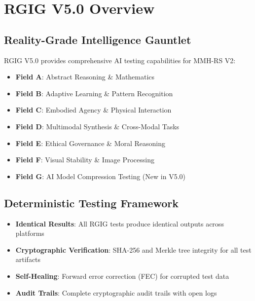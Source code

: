 \documentclass[12pt,a4paper]{article}
\begin{document}
\section{RGIG V5.0 Overview}

\subsection{Reality-Grade Intelligence Gauntlet}
RGIG V5.0 provides comprehensive AI testing capabilities for MMH-RS V2:

\begin{itemize}
    \item \textbf{Field A}: Abstract Reasoning \& Mathematics
    \item \textbf{Field B}: Adaptive Learning \& Pattern Recognition
    \item \textbf{Field C}: Embodied Agency \& Physical Interaction
    \item \textbf{Field D}: Multimodal Synthesis \& Cross-Modal Tasks
    \item \textbf{Field E}: Ethical Governance \& Moral Reasoning
    \item \textbf{Field F}: Visual Stability \& Image Processing
    \item \textbf{Field G}: AI Model Compression Testing (New in V5.0)
\end{itemize}

\subsection{Deterministic Testing Framework}
\begin{itemize}
    \item \textbf{Identical Results}: All RGIG tests produce identical outputs across platforms
    \item \textbf{Cryptographic Verification}: SHA-256 and Merkle tree integrity for all test artifacts
    \item \textbf{Self-Healing}: Forward error correction (FEC) for corrupted test data
    \item \textbf{Audit Trails}: Complete cryptographic audit trails with open logs
\end{itemize}

\end{document}
